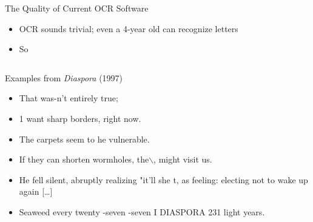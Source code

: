 \documentclass[professionalfonts, xcolor={usenames,svgnames,x11names,table}]{beamer}
\begin{document}
\begin{frame}{The Quality of Current OCR Software}
    \begin{itemize}
        \item OCR sounds trivial; even a 4-year old can recognize letters
        \item So 
    \end{itemize}
    \begin{columns}
        \begin{exampleblock}{Examples from \emph{Diaspora} (1997)}
            \begin{itemize}
                \item That was-n't entirely true;
                \item 1 want sharp borders, right now.
                \item The carpets seem to he vulnerable.
                \item If they can shorten wormholes, the$\backslash$, might visit us.
                \item He fell silent, abruptly realizing "it'll she t, as feeling: electing not to wake up again [\ldots]
                \item Seaweed every twenty -seven -seven I DIASPORA 231 light years.
            \end{itemize}
        \end{exampleblock}


\end{columns}
\end{frame}
\end{document}
